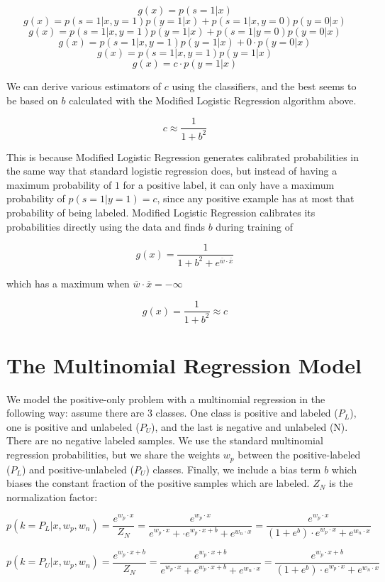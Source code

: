 \documentclass{article}
\begin{document}
$$ g(x) = p(s=1|x) $$
$$ g(x) = p(s=1|x,y=1)p(y=1|x) + p(s=1|x,y=0)p(y=0|x)$$
$$ g(x) = p(s=1|x,y=1)p(y=1|x) + p(s=1|y=0)p(y=0|x)$$
$$ g(x) = p(s=1|x,y=1)p(y=1|x) + 0 \cdot p(y=0|x)$$
$$ g(x) = p(s=1|x,y=1)p(y=1|x)$$
$$ g(x) = c \cdot p(y=1|x)$$

We can derive various estimators of $c$ using the classifiers, and the best seems to be based on $b$ calculated with the Modified Logistic Regression algorithm above.

$$c \approx \frac{1}{1 + b^2}$$

This is because Modified Logistic Regression generates calibrated probabilities in the same way that standard logistic regression does, but instead of having a maximum probability of $1$ for a positive label, it can only have a maximum probability of $p(s=1|y=1)=c$, since any positive example has at most that probability of being labeled.  Modified Logistic Regression calibrates its probabilities directly using the data and finds $b$ during training of

$$g(x) = \frac{1}{1 + b^2 + e^{\overline{w} \cdot \overline{x}}}$$

which has a maximum when $\overline{w} \cdot \overline{x}=-\infty$

$$g(x) = \frac{1}{1 + b^2} \approx c$$


\section{The Multinomial Regression Model}

We model the positive-only problem with a multinomial regression in the following way: assume there are 3 classes.  One class is positive and labeled ($P_L$), one is positive and unlabeled ($P_U$), and the last is negative and unlabeled (N).  There are no negative labeled samples.  We use the standard multinomial regression probabilities, but we share the weights $w_p$ between the positive-labeled ($P_L$) and positive-unlabeled ($P_U$) classes. Finally, we include a bias term $b$ which biases the constant fraction of the positive samples which are labeled.  $Z_N$ is the normalization factor:

$$
p(k=P_L | x, w_p, w_n) =  \frac{e^{w_p \cdot x}}{Z_N} = \frac{e^{w_p \cdot x}}{e^{w_p \cdot x} + \cdot e^{w_p \cdot x + b} + e^{w_n \cdot x}} = \frac{e^{w_p \cdot x}}{(1 + e^{b}) \cdot e^{w_p \cdot x} + e^{w_n \cdot x}}
$$

$$
p(k=P_U | x, w_p, w_n) =  \frac{e^{w_p \cdot x + b}}{Z_N} = \frac{e^{w_p \cdot x + b}}{e^{w_p \cdot x} + e^{w_p \cdot x + b} + e^{w_n \cdot x}} = \frac{e^{w_p \cdot x + b}}{(1 + e^{b}) \cdot e^{w_p \cdot x} + e^{w_n \cdot x}}
$$
\end{document}
